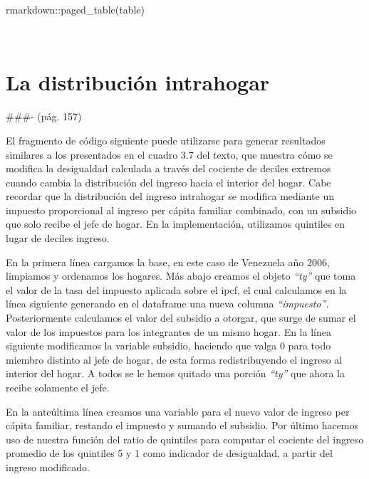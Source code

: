 \documentclass[
]{book}
\newenvironment{Shaded}{\begin{snugshade}}{\end{snugshade}}
\newcommand{\FunctionTok}[1]{\textcolor[rgb]{0.00,0.00,0.00}{#1}}
\newcommand{\NormalTok}[1]{#1}
\newcommand{\SpecialCharTok}[1]{\textcolor[rgb]{0.00,0.00,0.00}{#1}}
\begin{document}
\begin{Shaded}
\begin{Highlighting}[]
\NormalTok{rmarkdown}\SpecialCharTok{::}\FunctionTok{paged\_table}\NormalTok{(table)}
\end{Highlighting}
\end{Shaded}

~

\hypertarget{la-distribuciuxf3n-intrahogar}{%
\section{La distribución intrahogar}\label{la-distribuciuxf3n-intrahogar}}

\#\#\#- (pág. 157)

El fragmento de código siguiente puede utilizarse para generar resultados similares a los presentados en el cuadro 3.7 del texto, que muestra cómo se modifica la desigualdad calculada a través del cociente de deciles extremos cuando cambia la distribución del ingreso hacia el interior del hogar. Cabe recordar que la distribución del ingreso intrahogar se modifica mediante un impuesto proporcional al ingreso per cápita familiar combinado, con un subsidio que solo recibe el jefe de hogar. En la implementación, utilizamos quintiles en lugar de deciles ingreso.

En la primera línea cargamos la base, en este caso de Venezuela año 2006, limpiamos y ordenamos los hogares. Más abajo creamos el objeto \emph{``ty''} que toma el valor de la tasa del impuesto aplicada sobre el ipcf, el cual calculamos en la línea siguiente generando en el dataframe una nueva columna \emph{``impuesto''}. Posteriormente calculamos el valor del subsidio a otorgar, que surge de sumar el valor de los impuestos para los integrantes de un mismo hogar. En la línea siguiente modificamos la variable subsidio, haciendo que valga 0 para todo miembro distinto al jefe de hogar, de esta forma redistribuyendo el ingreso al interior del hogar. A todos se le hemos quitado una porción \emph{``ty''} que ahora la recibe solamente el jefe.

En la anteúltima línea creamos una variable para el nuevo valor de ingreso per cápita familiar, restando el impuesto y sumando el subsidio. Por último hacemos uso de nuestra función del ratio de quintiles para computar el cociente del ingreso promedio de los quintiles 5 y 1 como indicador de desigualdad, a partir del ingreso modificado.
\end{document}

